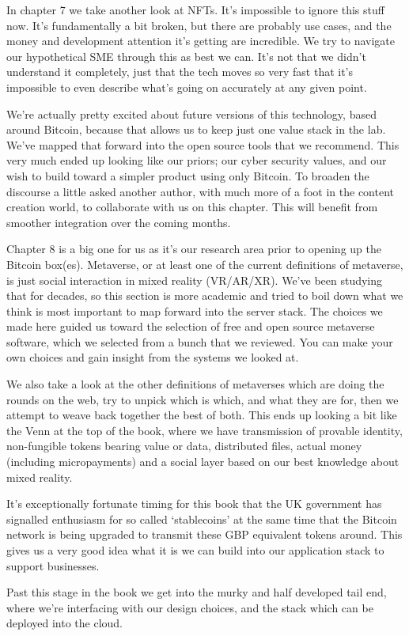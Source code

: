 In chapter 7 we take another look at NFTs. It’s impossible to ignore this stuff now. It’s fundamentally a bit broken, but there are probably use cases, and the money and development attention it’s getting are incredible. We try to navigate our hypothetical SME through this as best we can. It’s not that we didn’t understand it completely, just that the tech moves so very fast that it’s impossible to even describe what’s going on accurately at any given point. \par
We’re actually pretty excited about future versions of this technology, based around Bitcoin, because that allows us to keep just one value stack in the lab. We’ve mapped that forward into the open source tools that we recommend. This very much ended up looking like our priors; our cyber security values, and our wish to build toward a simpler product using only Bitcoin. To broaden the discourse a little asked another author, with much more of a foot in the content creation world, to collaborate with us on this chapter. This will benefit from smoother integration over the coming months.\par
Chapter 8 is a big one for us as it’s our research area prior to opening up the Bitcoin box(es). Metaverse, or at least one of the current definitions of metaverse, is just social interaction in mixed reality (VR/AR/XR). We’ve been studying that for decades, so this section is more academic and tried to boil down what we think is most important to map forward into the server stack. The choices we made here guided us toward the selection of free and open source metaverse software, which we selected from a bunch that we reviewed. You can make your own choices and gain insight from the systems we looked at.\par
We also take a look at the other definitions of metaverses which are doing the rounds on the web, try to unpick which is which, and what they are for, then we attempt to weave back together the best of both. This ends up looking a bit like the Venn at the top of the book, where we have transmission of provable identity, non-fungible tokens bearing value or data, distributed files, actual money (including micropayments) and a social layer based on our best knowledge about mixed reality.\par
It's exceptionally fortunate timing for this book that the UK government has signalled enthusiasm for so called `stablecoins' at the same time that the Bitcoin network is being upgraded to transmit these GBP equivalent tokens around. This gives us a very good idea what it is we can build into our application stack to support businesses.\par 
Past this stage in the book we get into the murky and half developed tail end, where we’re interfacing with our design choices, and the stack which can be deployed into the cloud.


